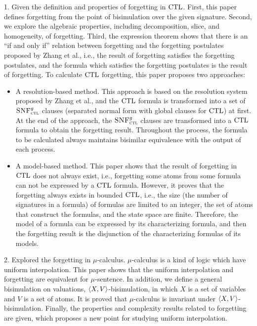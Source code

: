\begin{englishabstract}
1. Given the definition and properties of forgetting in $\textrm{CTL}$. First, this paper defines forgetting from the point of bisimulation over the given signature. Second, we explore the algebraic properties, including decomposition, slice, and homogeneity, of forgetting. Third, the expression theorem shows that there is an ``if and only if” relation between forgetting and the forgetting postulates proposed by Zhang et al., i.e., the result of forgetting satisfies the forgetting postulates, and the formula which satisfies the forgetting postulates is the result of forgetting.
To calculate $\textrm{CTL}$ forgetting, this paper proposes two approaches:

\begin{itemize}
	\item A resolution-based method. This approach is based on the resolution system proposed by Zhang et al., and the $\textrm{CTL}$ formula is transformed into a set of ${\textsc{SNF}_{\textsc{ctl}}^g}$ clauses (separated normal form with global clauses for $\textrm{CTL}$) at first. At the end of the approach, the ${\textsc{SNF}_{\textsc{ctl}}^g}$ clauses are transformed into a $\textrm{CTL}$ formula to obtain the forgetting result. Throughout the process, the formula to be calculated always maintains bisimilar equivalence with the output of each process. 
	\item A model-based method. This paper shows that the result of forgetting in $\textrm{CTL}$ does not always exist, i.e., forgetting some atoms from some formula can not be expressed by a $\textrm{CTL}$ formula. However, it proves that the forgetting always exists in bounded $\textrm{CTL}$, i.e., the size (the number of signatures in a formula) of formulas are limited to an integer, the set of atoms that construct the formulas, and the state space are finite. Therefore, the model of a formula can be expressed by its characterizing formula, and then the forgetting result is the disjunction of the characterizing formulas of its models. 
\end{itemize}

2. Explored the forgetting in $\mu$-calculus. $\mu$-calculus is a kind of logic which have uniform interpolation. This paper shows that the uniform interpolation and forgetting  are equivalent for $\mu$-sentence.
In addition, we define a general bisimulation on valuations, ${\langle{X,V}\rangle}$-bisimulation, in which $X$ is a set of variables and $V$ is a set of atoms.  It is proved that  $\mu$-calculus is invariant under ${\langle{X,V}\rangle}$-bisimulation.
Finally, the properties and complexity results related to forgetting are given, which proposes a new point for studying uniform interpolation.


\end{englishabstract}
